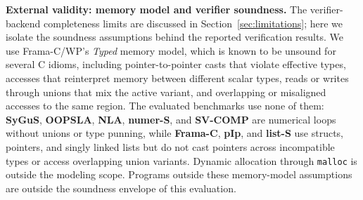 \smallskip
\noindent\textbf{External validity: memory model and verifier soundness.}
The verifier-backend completeness limits are discussed in
Section~\ref{sec:limitations}; here we isolate the soundness assumptions behind
the reported verification results. We use Frama-C/WP's \emph{Typed} memory model,
which is known to be unsound for several C idioms, including pointer-to-pointer
casts that violate effective types, accesses that reinterpret memory between
different scalar types, reads or writes through unions that mix the active
variant, and overlapping or misaligned accesses to the same region. The evaluated
benchmarks use none of them: \textbf{SyGuS}, \textbf{OOPSLA}, \textbf{NLA},
\textbf{numer-S}, and \textbf{SV-COMP} are numerical loops without unions or type
punning, while \textbf{Frama-C}, \textbf{pIp}, and \textbf{list-S} use structs,
pointers, and singly linked lists but do not cast pointers across incompatible
types or access overlapping union variants. Dynamic allocation through
\texttt{malloc} is outside the modeling scope. Programs outside these memory-model
assumptions are outside the soundness envelope of this evaluation.
